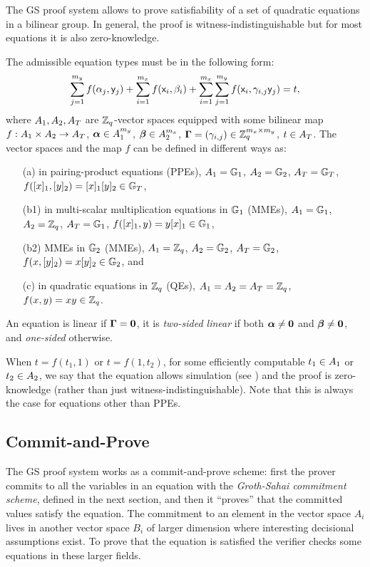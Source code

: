 The GS proof system allows to prove satisfiability of a set of quadratic equations in a bilinear group. In general, the proof is witness-indistinguishable but for most equations it is also zero-knowledge.

The admissible equation types must be in the following form:
\begin{equation}\label{gseq}
\sum_{j=1}^{m_y} f(\alpha_j, \mathsf{y}_j)+\sum_{i=1}^{m_x} f(\mathsf{x}_i, \beta_i)+\sum_{i=1}^{m_x} \sum_{j=1}^{m_y}  f(\mathsf{x}_i,\gamma_{i,j} \mathsf{y}_j)=t,
\end{equation}
 where $A_1,A_2,A_T$ are $\mathbb{Z}_q$-vector spaces equipped with some bilinear map $f:A_1\times A_2 \rightarrow A_T$, $\boldsymbol \alpha  \in A_1^{m_y}$, $\boldsymbol \beta  \in A_2^{m_x}$, $\mathbf{{\Gamma}}=(\gamma_{i,j}) \in \mathbb{Z}_q^{m_x\times m_y}$, $t \in A_T$. The vector spaces and the map $f$ can be defined in different ways as:
\begin{itemize}
\item[(a)] in pairing-product equations (PPEs), $A_1=\mathbb{G}_1$, $A_2=\mathbb{G}_2$, $A_T=\mathbb{G}_T$, $f([x]_1,[y]_2)=[x]_1 [y]_2 \in \mathbb{G}_T$,
\item[(b1)] in multi-scalar multiplication equations in $\mathbb{G}_1$ (MMEs), $A_1=\mathbb{G}_1$, $A_2=\mathbb{Z}_q$, $A_T=\mathbb{G}_1$, $f([x]_1,y)=y [x]_1 \in \mathbb{G}_1$,
\item[(b2)] MMEs in $\mathbb{G}_2$ (MMEs),  $A_1=\mathbb{Z}_q$, $A_2=\mathbb{G}_2$, $A_T=\mathbb{G}_2$, $f(x,[y]_2)=x [y]_2 \in \mathbb{G}_2$, and
\item[(c)] in quadratic equations in $\mathbb{Z}_q$ (QEs), $A_1=A_2=A_T=\mathbb{Z}_q$, $f(x,y)=xy \in \mathbb{Z}_q$.
\end{itemize} 
 An equation is linear if $\mathbf{{\Gamma}}=\mathbf{0}$, 
 it is \textit{two-sided linear} if both $\boldsymbol \alpha \neq \mathbf{0}$ and $\boldsymbol \beta \neq \mathbf{0}$, and \textit{one-sided} otherwise.

When $t=f(t_1,1)$ or $t=f(1,t_2)$, for some efficiently computable $t_1\in A_1$ or $t_2\in A_2$, we say that the equation allows simulation (see \cite[Section~11]{SIAMJC:GroSah12}) and the proof is zero-knowledge (rather than just witness-indistinguishable). Note that this is always the case for equations other than PPEs.

\subsection{Commit-and-Prove} The GS proof system works as a commit-and-prove scheme: first the prover commits to 
all the variables in an equation with the \emph{Groth-Sahai commitment scheme}, defined in the next section, and then it ``proves'' that the committed values satisfy the equation. The commitment to an element in the vector space $A_i$ lives in another vector space $B_i$ of larger dimension where interesting decisional assumptions exist. To prove that the equation is satisfied the verifier checks some equations in these larger fields.

